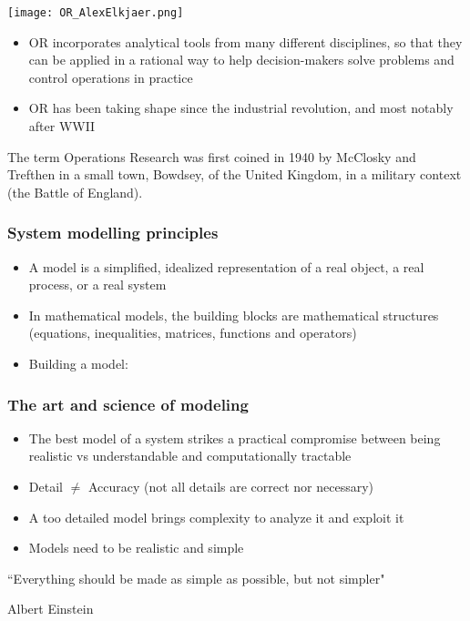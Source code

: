 \documentclass[c]{beamer}
\begin{document}

\begin{frame}
  \begin{center}
    \texttt{[image: OR\_AlexElkjaer.png]}
  \end{center}
\end{frame}

\begin{frame}
  \begin{itemize}
    \item OR incorporates analytical tools from many different disciplines, so that they can be applied in a rational way to help decision-makers solve problems and control operations in practice
    \item OR has been taking shape since the industrial revolution, and most notably after WWII
  \end{itemize}
  The term Operations Research was first coined in 1940 by McClosky and Trefthen
in a small town, Bowdsey, of the United Kingdom, in a military context (the Battle of England).
\end{frame}

\begin{frame}
  \frametitle{System modelling principles}
  \begin{itemize}
    \item A model is a simplified, idealized representation of a real object, a real process, or a real system
    \item In mathematical models, the building blocks are mathematical structures (equations, inequalities, matrices, functions and operators)
    \item Building a model:
          
  \end{itemize}
\end{frame}

\begin{frame}
  \frametitle{The art and science of modeling}
  \begin{itemize}
    \item The best model of a system strikes a practical compromise between being realistic vs understandable and computationally tractable
    \item Detail $\neq$ Accuracy (not all details are correct nor necessary)
    \item A too detailed model brings complexity to analyze it and exploit it
    \item Models need to be realistic and simple
  \end{itemize}
  \epigraph{``Everything should be made as simple as possible, but not simpler"}{Albert Einstein}
\end{frame}
\end{document}
